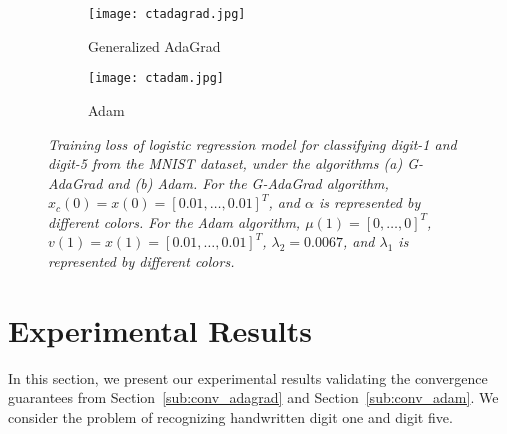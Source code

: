 \begin{figure*}[htb!]
\centering
\begin{subfigure}{.5\textwidth}
  \begin{center}
  \texttt{[image: ctadagrad.jpg]}
  \caption{Generalized AdaGrad}
  \label{fig:log_adagrad}
  \end{center}
\end{subfigure}%
\begin{subfigure}{.5\textwidth}
  \begin{center}
  \texttt{[image: ctadam.jpg]}
  \caption{Adam}
  \label{fig:log_adam}
  \end{center}
\end{subfigure}
\caption{\footnotesize{\it Training loss of logistic regression model for classifying digit-1 and digit-5 from the MNIST dataset, under the algorithms (a) G-AdaGrad and (b) Adam. For the G-AdaGrad algorithm, $x_c(0) = x(0) = [0.01,\ldots,0.01]^T$, and $\alpha$ is represented by different colors. For the Adam algorithm, $\mu(1) = [0,\ldots,0]^T$, $v(1) = x(1) = [0.01,\ldots,0.01]^T$, $\lambda_2 = 0.0067$, and $\lambda_1$ is represented by different colors.}}
\label{fig:logreg}
\end{figure*}

\section{Experimental Results}
\label{sec:exp}

In this section, we present our experimental results validating the convergence guarantees from Section~\ref{sub:conv_adagrad} and Section~\ref{sub:conv_adam}. We consider the problem of recognizing handwritten digit one and digit five. 

